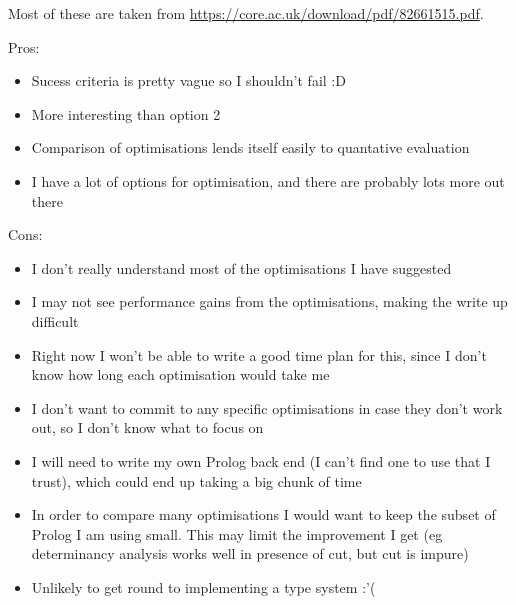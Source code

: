 \documentclass{article}
\begin{document}
Most of these are taken from \url{https://core.ac.uk/download/pdf/82661515.pdf}.

Pros:
\begin{itemize}
\item Sucess criteria is pretty vague so I shouldn't fail :D
\item More interesting than option 2
\item Comparison of optimisations lends itself easily to quantative evaluation
\item I have a lot of options for optimisation, and there are probably lots more out there
\end{itemize}

Cons:
\begin{itemize}
\item I don't really understand most of the optimisations I have suggested
\item I may not see performance gains from the optimisations, making the write up difficult
\item Right now I won't be able to write a good time plan for this, since I don't know how long each optimisation would take me
\item I don't want to commit to any specific optimisations in case they don't work out, so I don't know what to focus on
\item I will need to write my own Prolog back end (I can't find one to use that I trust), which could end up taking a big chunk of time
\item In order to compare many optimisations I would want to keep the subset of Prolog I am using small. This may limit the improvement I get (eg determinancy analysis works well in presence of cut, but cut is impure)
\item Unlikely to get round to implementing a type system :'(
\end{itemize}
\end{document}
